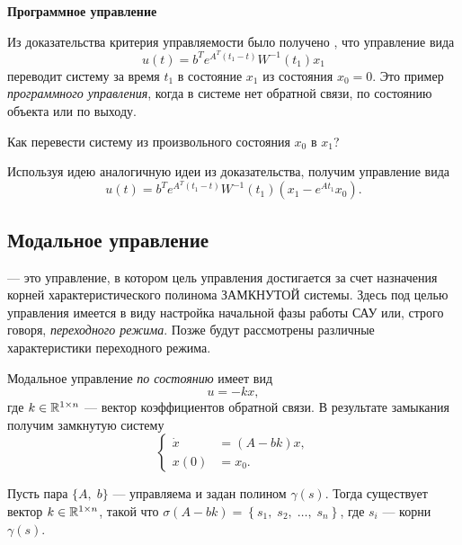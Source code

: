 \documentclass[../../TAU.tex]{subfiles}
\begin{document}
    \proof \cite[стр. 308-311]{voron2}
    \par
    \textbf{Программное управление}
    \par
    Из доказательства критерия управляемости было получено \cite[стр. 311]{voron2}, что управление вида
    $$
        u(t) = b^Te^{A^T(t_1-t)}W^{-1}(t_1)x_1
    $$
    переводит систему за время $t_1$ в состояние $x_1$ из состояния $x_0 = 0$. Это пример {\it программного управления}, когда в системе нет обратной связи, по состоянию объекта или по выходу.

    Как перевести систему из произвольного состояния $x_0$ в $x_1$?

    Используя идею аналогичную идеи из доказательства, получим управление вида
    $$
        u(t) = b^Te^{A^T(t_1-t)}W^{-1}(t_1)(x_1 - e^{At_1}x_0).
    $$

\subsection{Модальное управление}

     --- это управление, в котором цель управления достигается за счет назначения корней характеристического полинома ЗАМКНУТОЙ системы. Здесь под целью управления имеется в виду настройка начальной фазы работы САУ или, строго говоря, {\it переходного режима}. Позже будут рассмотрены различные характеристики переходного режима.

    Модальное управление {\it по состоянию} имеет вид
    $$
        u = -kx,
    $$
    где $k\in\mathbb{R}^{1\times n}$ --- вектор коэффициентов обратной связи. В результате замыкания получим замкнутую систему
    $$
        \left\{
        \begin{aligned}
            \dot x &= (A - bk)x,\\
            x(0) &= x_0.
        \end{aligned}
        \right.
    $$

    \begin{theor} 
        Пусть пара $\{A,\; b\}$ --- управляема и задан полином $\gamma(s)$. Тогда существует вектор 
        $k\in\mathbb{R}^{1\times n}$, 
        такой что 
        $\sigma(A-bk) = \left\{s_1,\; s_2,\;\ldots,\; s_n\right\}$, где $s_i$ --- корни $\gamma(s)$.
    \end{theor}
\end{document}

